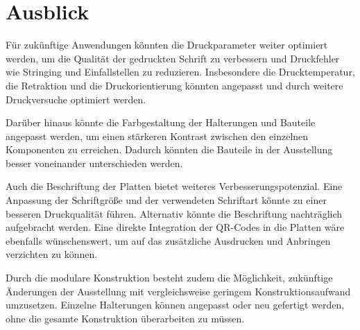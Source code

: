 \section{Ausblick}


Für zukünftige Anwendungen könnten die Druckparameter weiter optimiert werden, um die Qualität der gedruckten Schrift zu verbessern und Druckfehler wie Stringing und Einfallstellen zu reduzieren. Insbesondere die Drucktemperatur, die Retraktion und die Druckorientierung könnten angepasst und durch weitere Druckversuche optimiert werden.

Darüber hinaus könnte die Farbgestaltung der Halterungen und Bauteile angepasst werden, um einen stärkeren Kontrast zwischen den einzelnen Komponenten zu erreichen. Dadurch könnten die Bauteile in der Ausstellung besser voneinander unterschieden werden.

Auch die Beschriftung der Platten bietet weiteres Verbesserungspotenzial. Eine Anpassung der Schriftgröße und der verwendeten Schriftart könnte zu einer besseren Druckqualität führen. Alternativ könnte die Beschriftung nachträglich aufgebracht werden. Eine direkte Integration der QR-Codes in die Platten wäre ebenfalls wünschenswert, um auf das zusätzliche Ausdrucken und Anbringen verzichten zu können.

Durch die modulare Konstruktion besteht zudem die Möglichkeit, zukünftige Änderungen der Ausstellung mit vergleichsweise geringem Konstruktionsaufwand umzusetzen. Einzelne Halterungen können angepasst oder neu gefertigt werden, ohne die gesamte Konstruktion überarbeiten zu müssen.